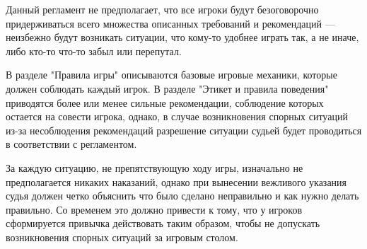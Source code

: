 \begin{additional}
Данный регламент не предполагает, что все игроки будут безоговорочно придерживаться всего множества описанных требований и рекомендаций --- неизбежно будут возникать ситуации, что кому-то удобнее играть так, а не иначе, либо кто-то что-то забыл или перепутал.

\vspace{0.3cm}

В разделе "Правила игры" описываются базовые игровые механики, которые должен соблюдать каждый игрок. В разделе "Этикет и правила поведения" приводятся более или менее сильные рекомендации, соблюдение которых остается на совести игрока, однако, в случае возникновения спорных ситуаций из-за несоблюдения рекомендаций разрешение ситуации судьей будет проводиться в соответствии с регламентом.

\vspace{0.3cm}

За каждую ситуацию, не препятствующую ходу игры, изначально не предполагается никаких наказаний, однако при вынесении вежливого указания судья должен четко объяснить что было сделано неправильно и как нужно делать правильно. Со временем это должно привести к тому, что у игроков сформируется привычка действовать таким образом, чтобы не допускать возникновения спорных ситуаций за игровым столом.

\end{additional}